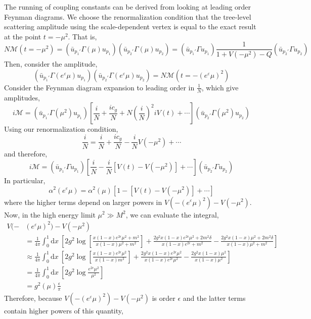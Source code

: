 \documentclass[12pt]{article}
\renewcommand{\d}[1]{ \mathrm{d}#1 \:}
\begin{document}
The running of coupling constants can be derived from looking at leading order Feynman diagrams. We choose the renormalization condition that the tree-level scattering amplitude using the scale-dependent vertex is equal to the exact result at the point $t = -\mu^2$. That is,
\[ N \mathcal{M}(t = -\mu^2) = ( \bar{u}_{p_1'} \Gamma(\mu) u_{p_1}) (\bar{u}_{p_2'} \Gamma(\mu) u_{p_2}) = ( \bar{u}_{p_1'} \Gamma u_{p_1}) \frac{1}{1 + V(-\mu^2) - Q} (\bar{u}_{p_2'} \Gamma u_{p_2}) \] 
Then, consider the amplitude, 
\[ ( \bar{u}_{p_1'} \Gamma(e^\varepsilon \mu) u_{p_1}) (\bar{u}_{p_2'} \Gamma(e^\varepsilon \mu) u_{p_2}) = N \mathcal{M}(t = -(e^\varepsilon \mu)^2) \]
Consider the Feynman diagram expansion to leading order in $\frac{1}{N}$, 
which give amplitudes,
\[ i\mathcal{M} =  ( \bar{u}_{p_1'} \Gamma(\mu^2) u_{p_1}) \left[  \frac{i}{N} + \frac{i c_g}{N} + N \left(\frac{i}{N}\right)^2 iV(t) + \cdots \right] (\bar{u}_{p_2'} \Gamma(\mu^2) u_{p_2}) \] 
Using our renormalization condition,
\[ \frac{i}{N} = \frac{i}{N} + \frac{ic_g}{N} - \frac{i}{N} V(-\mu^2) + \cdots \]
and therefore,
\[ i\mathcal{M} =  ( \bar{u}_{p_1'} \Gamma u_{p_1}) \left[  \frac{i}{N} - \frac{i}{N} [V(t) - V(-\mu^2)] + \cdots \right] (\bar{u}_{p_2'} \Gamma u_{p_2}) \] 
In particular,
\[ \alpha^2(e^\varepsilon \mu) = \alpha^2(\mu) \left[ 1 - [V(t) - V(-\mu^2)] + \cdots \right] \] 
where the higher terms depend on larger powers in $V(-(e^\varepsilon \mu)^2) - V(-\mu^2)$. 
Now, in the high energy limit $\mu^2 \gg M^2$, we can evaluate the integral,
\begin{align*}
V(-&(e^\varepsilon \mu)^2) - V(-\mu^2)
\\
& = \frac{1}{4 \pi} \int_0^1 \d{x} \left[ 2 g^2 \log \left[ \frac{x(1 - x) e^{2\epsilon} \mu^2 + m^2}{x(1-x) \mu^2 + m^2} \right] + \frac{2g^2 x(1-x) e^{2\epsilon} \mu^2 + 2 m^2 \delta}{x(1-x) e^{2 \epsilon} + m^2} - \frac{2 g^2 x(1 - x) \mu^2 + 2 m^2 \delta}{x (1 - x) \mu^2 + m^2} \right]
\\
& \approx \frac{1}{4 \pi} \int_0^1 \d{x} \left[ 2 g^2 \log \left[ \frac{x(1 - x) e^{2\epsilon} \mu^2}{x(1 - x)m^2} \right] + \frac{2g^2 x(1-x) e^{2\epsilon} \mu^2 }{x(1-x) e^{2\epsilon} \mu^2} - \frac{2g^2 x(1-x) \mu^2 }{x(1 - x) \mu^2} \right]
\\
& = \frac{1}{4 \pi} \int_0^1 \d{x} \left[ 2g^2 \log{ \frac{e^{2\epsilon} \mu^2}{\mu^2} }  \right]
\\
& = g^2(\mu) \frac{\epsilon}{\pi}
\end{align*}
Therefore, because $V(-(e^\varepsilon \mu)^2) - V(-\mu^2)$ is order $\epsilon$ and the latter terms contain higher powers of this quantity,
\end{document}
